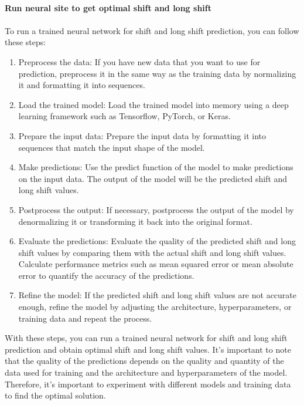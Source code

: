         \\
        \textbf{Run neural site to get optimal shift and long shift}\\
        \\
        To run a trained neural network for shift and long shift prediction, you can follow these steps:
        \begin{enumerate}
            \item Preprocess the data: If you have new data that you want to use for prediction, preprocess it in the same way as the training data by normalizing it and formatting it into sequences.
            \item Load the trained model: Load the trained model into memory using a deep learning framework such as Tensorflow, PyTorch, or Keras.
            \item Prepare the input data: Prepare the input data by formatting it into sequences that match the input shape of the model.
            \item Make predictions: Use the predict function of the model to make predictions on the input data. The output of the model will be the predicted shift and long shift values.
            \item Postprocess the output: If necessary, postprocess the output of the model by denormalizing it or transforming it back into the original format.
            \item Evaluate the predictions: Evaluate the quality of the predicted shift and long shift values by comparing them with the actual shift and long shift values. Calculate performance metrics such as mean squared error or mean absolute error to quantify the accuracy of the predictions.
            \item Refine the model: If the predicted shift and long shift values are not accurate enough, refine the model by adjusting the architecture, hyperparameters, or training data and repeat the process.
        \end{enumerate}
        With these steps, you can run a trained neural network for shift and long shift prediction and obtain optimal
        shift and long shift values. It's important to note that the quality of the predictions depends on the quality and
        quantity of the data used for training and the architecture and hyperparameters of the model. Therefore, it's important
        to experiment with different models and training data to find the optimal solution.
